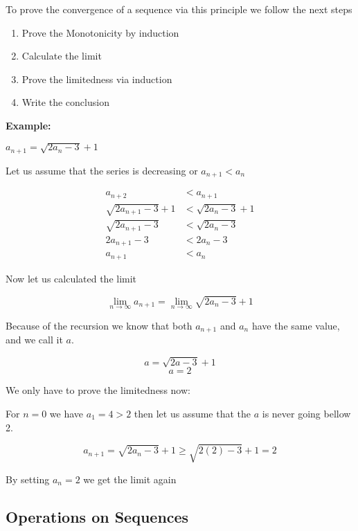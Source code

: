 To prove the convergence of a sequence via this principle we follow the next steps

\begin{enumerate}

    \item Prove the Monotonicity by induction

    \item Calculate the limit

    \item Prove the limitedness via induction

    \item Write the conclusion

\end{enumerate}

\textbf{Example:} 

\(a_{n + 1} = \sqrt{2a_n - 3} + 1\)

Let us assume that the series is decreasing or \(a_{n + 1} < a_{n}\)

\begin{align*}
    a_{n + 2} &< a_{n + 1} \\
    \sqrt{2a_{n + 1} -3} + 1 &< \sqrt{2a_{n} - 3} + 1 \\
    \sqrt{2a_{n + 1} -3} &< \sqrt{2a_{n} - 3} \\
    2a_{n + 1} - 3 &< 2a_{n} - 3 \\
    a_{n + 1} &< a_{n}
\end{align*}

\QED

Now let us calculated the limit

\[
    \lim_{n \rightarrow \infty} a_{n + 1} = \lim_{n \rightarrow \infty} \sqrt{2a_n - 3} + 1
\]

Because of the recursion we know that both \(a_{n + 1}\) and \(a_n\) have the same value, 
and we call it \(a\).

\[
    a = \sqrt{2a -3} +1
\]
\[
    a = 2
\]

We only have to prove the limitedness now:

For \(n = 0\) we have \(a_1 = 4 > 2\) then let us assume that the \(a\) is never going bellow 2.

\[
    a_{n + 1} = \sqrt{2a_n - 3} + 1 \ge \sqrt{2(2) - 3} + 1 = 2
\]

By setting \(a_n = 2\) we get the limit again

\QED

\subsection{Operations on Sequences}

